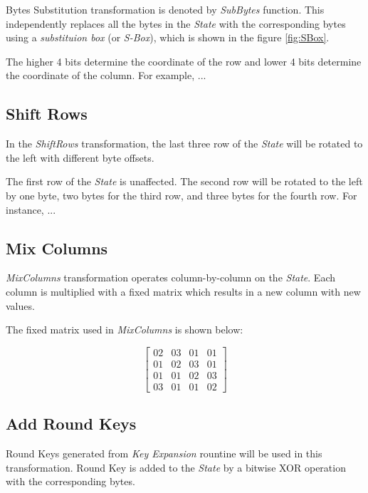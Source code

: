 \documentclass[a4paper, 10pt]{article}
\begin{document}
\begin{multicols}{2}
            Bytes Substitution transformation is denoted by \textit{SubBytes} function. This independently replaces all the bytes in the \textit{State} with the corresponding bytes using a \textit{substituion box} (or \textit{S-Box}), which is shown in the figure \ref{fig:SBox}.

            The higher 4 bits determine the coordinate of the row and lower 4 bits determine the coordinate of the column. For example, ...

            \subsection{Shift Rows}

            In the \textit{ShiftRows} transformation, the last three row of the \textit{State} will be rotated to the left with different byte offsets.

            The first row of the \textit{State} is unaffected. The second row will be rotated to the left by one byte, two bytes for the third row, and three bytes for the fourth row. For instance, ...

            \subsection{Mix Columns}

            \textit{MixColumns} transformation operates column-by-column on the \textit{State}. Each column is multiplied with a fixed matrix which results in a new column with new values.

            The fixed matrix used in \textit{MixColumns} is shown below:

            \begin{equation}
            \begin{bmatrix}
                02 & 03 & 01 & 01\\
                01 & 02 & 03 & 01\\
                01 & 01 & 02 & 03\\
                03 & 01 & 01 & 02
            \end{bmatrix}
        \end{equation}

            \subsection{Add Round Keys}

            Round Keys generated from \textit{Key Expansion} rountine will be used in this transformation. Round Key is added to the \textit{State} by a bitwise XOR operation with the corresponding bytes.


\end{multicols}
\end{document}
